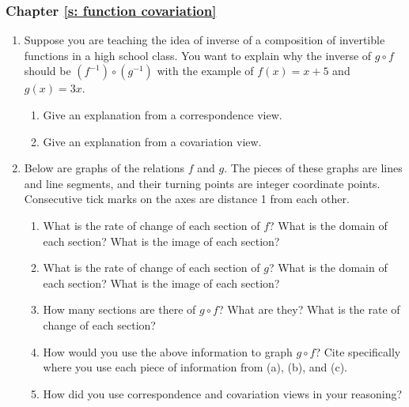 \documentclass[11pt]{article}
\theoremstyle{definition}
\begin{document}
\subsubsection*{Chapter \ref{s: function covariation}}
\begin{enumerate}[resume]
\item %
Suppose you are teaching the idea of inverse of a composition of invertible functions in a high school class. You want to explain why the inverse of $g\circ f$ should be $(f^{-1})\circ (g^{-1})$ with the example
of $f(x)=x+5$ and $g(x)=3x$.
	\begin{enumerate}
	\item Give an explanation from a correspondence view.
	\item Give an explanation from a covariation view.
	\end{enumerate}
	
\item 

Below are graphs of the relations $f$ and $g$. The pieces of these graphs are lines and line segments, and their  turning points are integer coordinate points. Consecutive tick marks on the axes are distance 1 from each other.
    \begin{enumerate}
    \item What is the rate of change of each section of $f$? What is the domain of each section?
     What is the image of each section?
    
    \item What is the rate of change of each section of $g$? What is the domain of each section?  What is the image of each section?
    
    \item How many sections are there of $g\circ f$? What are they? What is the rate of change of each section?
    
    \item How would you use the above information to graph $g\circ f$? Cite specifically where you use each piece of information from (a), (b), and (c).
    
    \item How did you use correspondence and covariation views in your reasoning?
    \end{enumerate}



\end{enumerate}
\end{document}
